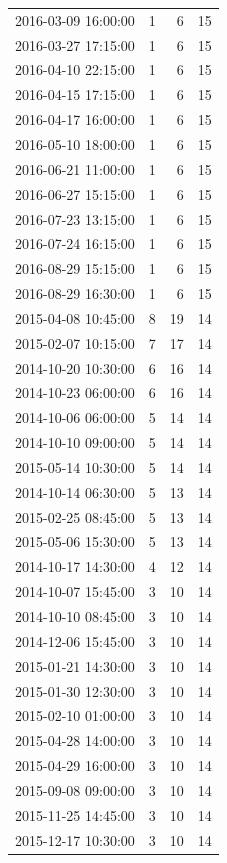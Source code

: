 \begin{tabular}{lrrr}
2016-03-09 16:00:00 & 1 & 6 & 15 \\
2016-03-27 17:15:00 & 1 & 6 & 15 \\
2016-04-10 22:15:00 & 1 & 6 & 15 \\
2016-04-15 17:15:00 & 1 & 6 & 15 \\
2016-04-17 16:00:00 & 1 & 6 & 15 \\
2016-05-10 18:00:00 & 1 & 6 & 15 \\
2016-06-21 11:00:00 & 1 & 6 & 15 \\
2016-06-27 15:15:00 & 1 & 6 & 15 \\
2016-07-23 13:15:00 & 1 & 6 & 15 \\
2016-07-24 16:15:00 & 1 & 6 & 15 \\
2016-08-29 15:15:00 & 1 & 6 & 15 \\
2016-08-29 16:30:00 & 1 & 6 & 15 \\
2015-04-08 10:45:00 & 8 & 19 & 14 \\
2015-02-07 10:15:00 & 7 & 17 & 14 \\
2014-10-20 10:30:00 & 6 & 16 & 14 \\
2014-10-23 06:00:00 & 6 & 16 & 14 \\
2014-10-06 06:00:00 & 5 & 14 & 14 \\
2014-10-10 09:00:00 & 5 & 14 & 14 \\
2015-05-14 10:30:00 & 5 & 14 & 14 \\
2014-10-14 06:30:00 & 5 & 13 & 14 \\
2015-02-25 08:45:00 & 5 & 13 & 14 \\
2015-05-06 15:30:00 & 5 & 13 & 14 \\
2014-10-17 14:30:00 & 4 & 12 & 14 \\
2014-10-07 15:45:00 & 3 & 10 & 14 \\
2014-10-10 08:45:00 & 3 & 10 & 14 \\
2014-12-06 15:45:00 & 3 & 10 & 14 \\
2015-01-21 14:30:00 & 3 & 10 & 14 \\
2015-01-30 12:30:00 & 3 & 10 & 14 \\
2015-02-10 01:00:00 & 3 & 10 & 14 \\
2015-04-28 14:00:00 & 3 & 10 & 14 \\
2015-04-29 16:00:00 & 3 & 10 & 14 \\
2015-09-08 09:00:00 & 3 & 10 & 14 \\
2015-11-25 14:45:00 & 3 & 10 & 14 \\
2015-12-17 10:30:00 & 3 & 10 & 14 \\

\end{tabular}
